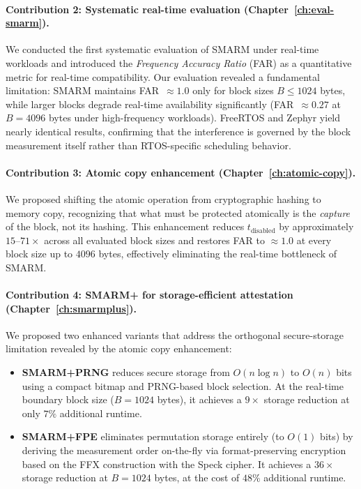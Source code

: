 \documentclass[a4paper,10pt]{article}
\begin{document}
{\paragraph{Contribution 2: Systematic real-time evaluation 
(Chapter~\ref{ch:eval-smarm}).}
We conducted the first systematic evaluation of SMARM under 
real-time workloads and introduced the \emph{Frequency Accuracy 
Ratio} (FAR) as a quantitative metric for real-time compatibility. 
Our evaluation revealed a fundamental limitation: SMARM maintains 
FAR~$\approx 1.0$ only for block sizes $B \leq 1024$ bytes, while 
larger blocks degrade real-time availability significantly 
(FAR~$\approx 0.27$ at $B = 4096$ bytes under high-frequency 
workloads). FreeRTOS and Zephyr yield nearly identical results, 
confirming that the interference is governed by the block 
measurement itself rather than RTOS-specific scheduling behavior.

\paragraph{Contribution 3: Atomic copy enhancement 
(Chapter~\ref{ch:atomic-copy}).}
We proposed shifting the atomic operation from cryptographic 
hashing to memory copy, recognizing that what must be protected 
atomically is the \emph{capture} of the block, not its hashing. 
This enhancement reduces $t_{\mathrm{disabled}}$ by approximately 
$15$--$71\times$ across all evaluated block sizes and restores 
FAR to $\approx 1.0$ at every block size up to $4096$ bytes, 
effectively eliminating the real-time bottleneck of SMARM.

\paragraph{Contribution 4: SMARM+ for storage-efficient attestation 
(Chapter~\ref{ch:smarmplus}).}
We proposed two enhanced variants that address the orthogonal 
secure-storage limitation revealed by the atomic copy enhancement:

\begin{itemize}
    \item \textbf{SMARM+PRNG} reduces secure 
    storage from $O(n \log n)$ to $O(n)$ bits using a compact 
    bitmap and PRNG-based block selection. At the real-time 
    boundary block size ($B = 1024$ bytes), it achieves a 
    $9\times$ storage reduction at only $7\%$ additional runtime.
    
    \item \textbf{SMARM+FPE} eliminates 
    permutation storage entirely (to $O(1)$ bits) by deriving 
    the measurement order on-the-fly via format-preserving 
    encryption based on the FFX construction with the Speck 
    cipher. It achieves a $36\times$ storage reduction at 
    $B = 1024$ bytes, at the cost of $48\%$ additional runtime.
\end{itemize}

}
\end{document}
